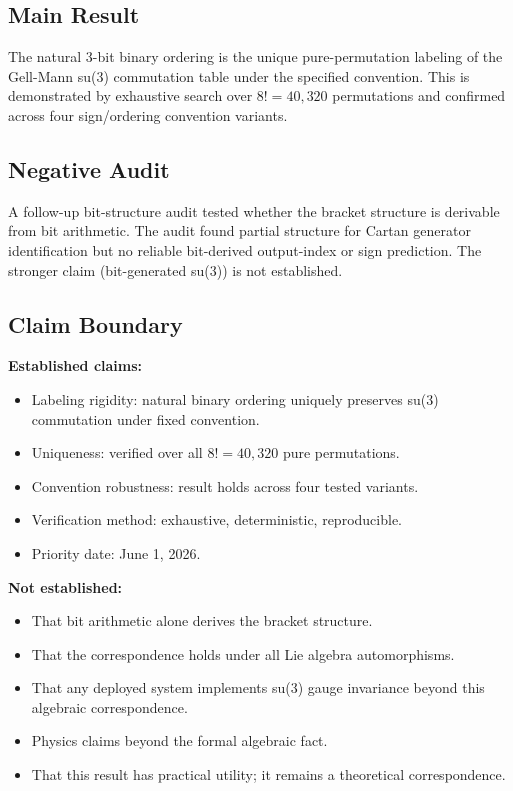 \documentclass[11pt,a4paper]{article}
\begin{document}
\subsection{Main Result}

The natural 3-bit binary ordering is the unique pure-permutation labeling of the Gell-Mann su(3) commutation table under the specified convention. This is demonstrated by exhaustive search over $8! = 40,320$ permutations and confirmed across four sign/ordering convention variants.

\subsection{Negative Audit}

A follow-up bit-structure audit tested whether the bracket structure is derivable from bit arithmetic. The audit found partial structure for Cartan generator identification but no reliable bit-derived output-index or sign prediction. The stronger claim (bit-generated su(3)) is not established.

\subsection{Claim Boundary}

\textbf{Established claims:}
\begin{itemize}
  \item Labeling rigidity: natural binary ordering uniquely preserves su(3) commutation under fixed convention.
  \item Uniqueness: verified over all $8! = 40,320$ pure permutations.
  \item Convention robustness: result holds across four tested variants.
  \item Verification method: exhaustive, deterministic, reproducible.
  \item Priority date: June 1, 2026.
\end{itemize}

\textbf{Not established:}
\begin{itemize}
  \item That bit arithmetic alone derives the bracket structure.
  \item That the correspondence holds under all Lie algebra automorphisms.
  \item That any deployed system implements su(3) gauge invariance beyond this algebraic correspondence.
  \item Physics claims beyond the formal algebraic fact.
  \item That this result has practical utility; it remains a theoretical correspondence.
\end{itemize}
\end{document}
